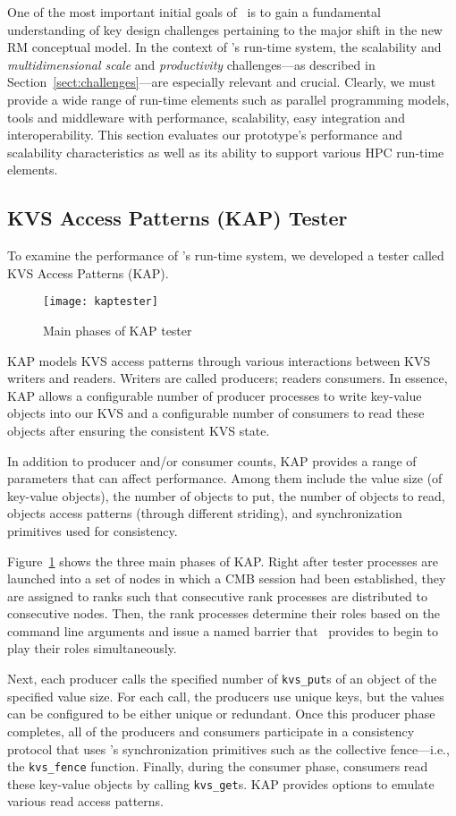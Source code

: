 One of the most important initial goals of \flux\ is to gain
a fundamental understanding of key design challenges pertaining
to the major shift in the new RM conceptual model.
In the context of \flux's run-time system, the scalability
and {\em multidimensional scale} and {\em productivity}
challenges---as described in Section~\ref{sect:challenges}---are especially
relevant and crucial. Clearly, we  must provide a wide range
of run-time elements such as parallel programming models,
tools and middleware with performance, scalability, easy integration
and interoperability.
This section evaluates our prototype's performance
and scalability characteristics as well as its ability
to support various HPC run-time elements.


\subsection{KVS Access Patterns (KAP) Tester}
To examine the performance of \flux's run-time system,
we developed a tester called KVS Access Patterns (KAP).
\begin{figure}
  \centering
  \texttt{[image: kaptester]}
  \caption{Main phases of KAP tester}
  \label{fig:kap}
\end{figure}
KAP models KVS access patterns through various interactions
between KVS writers and readers. Writers are called producers;
readers consumers.
In essence, KAP allows a configurable number of producer processes
to write key-value objects into our KVS 
and a configurable number of consumers to read these
objects after ensuring the consistent KVS state.

In addition to producer and/or consumer counts,
KAP provides a range of parameters that can affect performance.
Among them include the value size (of key-value objects),
the number of objects to put,
the number of objects to read, objects access 
patterns (through different striding), and
synchronization primitives used for consistency.

Figure~\ref{fig:kap} shows the three main phases of KAP.
Right after tester processes are launched into a set of nodes
in which a CMB session had been established,
they are assigned to ranks such that consecutive rank
processes are distributed to consecutive nodes.
Then, the rank processes determine their roles based
on the command line arguments and issue a named barrier
that \flux\ provides to begin to play their roles
simultaneously.

Next, each producer calls the specified number of
{\tt kvs\_put}s of an object of the specified value size.
For each call, the producers use unique keys, but
the values can be configured to be either unique
or redundant.
Once this producer phase completes, all of the producers and consumers
participate in a consistency protocol that uses
\flux's synchronization primitives such as the collective
fence---i.e., the {\tt kvs\_fence} function.
Finally, during the consumer phase, consumers read
these key-value objects by calling {\tt kvs\_get}s.
KAP provides options to emulate various read access
patterns.

